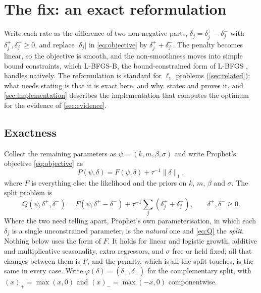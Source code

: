 \section{The fix: an exact reformulation}
\label{sec:reformulation}

Write each rate as the difference of two non-negative parts,
$\delta_j = \delta_j^+ - \delta_j^-$ with $\delta_j^+, \delta_j^- \ge 0$, and
replace $\lvert\delta_j\rvert$ in \eqref{eq:objective} by $\delta_j^+ + \delta_j^-$.
The penalty becomes linear, so the objective is smooth, and the non-smoothness
moves into simple bound constraints, which L-BFGS-B, the bound-constrained form of
L-BFGS \citep{byrd1995limited}, handles natively. The reformulation is standard for $\ell_1$ problems
(\cref{sec:related}); what needs stating is that it is exact here, and why.
 states and proves it, and \cref{sec:implementation}
describes the implementation that computes the optimum for the evidence of
\cref{sec:evidence}.

\subsection{Exactness}
\label{sec:reformulation:exact}

Collect the remaining parameters as $\psi = (k, m, \beta, \sigma)$ and write
Prophet's objective \eqref{eq:objective} as
\begin{equation}
  P(\psi, \delta) = F(\psi, \delta) + \tau^{-1}\lVert\delta\rVert_1 ,
  \label{eq:P}
\end{equation}
where $F$ is everything else: the likelihood and the priors on $k$, $m$, $\beta$ and
$\sigma$. The split problem is
\begin{equation}
  Q(\psi, \delta^+, \delta^-) = F(\psi, \delta^+ - \delta^-)
    + \tau^{-1}\textstyle\sum_j(\delta_j^+ + \delta_j^-),
  \qquad \delta^+, \delta^- \ge 0 .
  \label{eq:Q}
\end{equation}
Where the two need telling apart, Prophet's own parameterisation, in which each
$\delta_j$ is a single unconstrained parameter, is the \emph{natural} one and
\eqref{eq:Q} the \emph{split}. Nothing below uses the form of $F$. It holds for linear and logistic growth, additive
and multiplicative seasonality, extra regressors, and $\sigma$ free or held fixed;
all that changes between them is $F$, and the penalty, which is all the split
touches, is the same in every case. Write $\varphi(\delta) = (\delta_+, \delta_-)$ for the
complementary split, with $(x)_+ = \max(x, 0)$ and $(x)_- = \max(-x, 0)$
componentwise.

